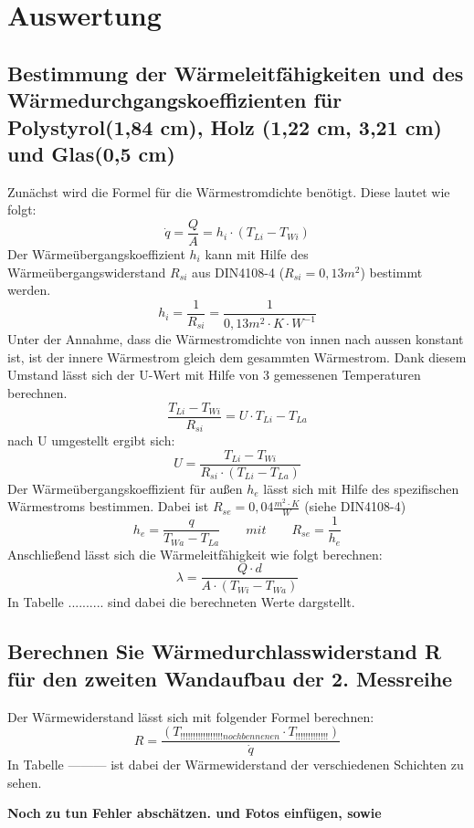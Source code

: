 \section{Auswertung}
\subsection{Bestimmung der Wärmeleitfähigkeiten und des Wärmedurchgangskoeffizienten für Polystyrol(1,84 cm), Holz (1,22 cm, 3,21 cm) und Glas(0,5 cm)}
Zunächst wird die Formel für die Wärmestromdichte benötigt. Diese lautet wie folgt:
\begin{equation}
\dot q=\frac{ Q }{ A }=h_{ i }\cdot(T_{ Li }-T_{Wi })
  \label{eq:230514_Wärmestromdichte}
\end{equation}
Der Wärmeübergangskoeffizient $h_{i}$ kann mit Hilfe des Wärmeübergangswiderstand $R_{si}$ aus DIN4108-4 ($R_{si}=0,13 m^2$) bestimmt werden.
\begin{equation}
h_{i}=\frac{ 1 }{ R_{ si } }=\frac{ 1 }{ 0,13m^2\cdot K \cdot W^{-1} }
  \label{eq:230514_Wärmeübergangskoeffizient}
\end{equation}
Unter der Annahme, dass die Wärmestromdichte von innen nach aussen konstant ist, ist der innere Wärmestrom gleich dem gesammten Wärmestrom. Dank diesem Umstand lässt sich der U-Wert mit Hilfe von 3 gemessenen Temperaturen berechnen.
\begin{equation}
\frac{ T_{Li} - T_{Wi}}{ R_{ si } }=U \cdot T_{Li} - T_{La}
  \label{eq:230514_u1}
\end{equation}
nach U umgestellt ergibt sich: 
\begin{equation}
U = \frac{ T_{Li} - T_{Wi}}{ R_{ si } \cdot  (T_{Li} - T_{La})}
  \label{eq:230514_u2}
\end{equation}
Der Wärmeübergangskoeffizient für außen $h_{e}$ lässt sich mit Hilfe des spezifischen Wärmestroms bestimmen. Dabei ist $R_{se}=0,04 \frac{ m^2 \cdot K }{W}$ (siehe DIN4108-4)
\begin{equation}
h_{e}=\frac{ q }{ T_{Wa} - T_{La} }   \qquad  mit     \qquad       R_{se}=\frac{ 1 }{ h_{e} }
  \label{eq:230514_h_e}
\end{equation}
Anschließend lässt sich die Wärmeleitfähigkeit wie folgt berechnen:
\begin{equation}
\lambda=\frac{ Q \cdot d }{ A \cdot ( T_{Wi} - T_{Wa} )}
  \label{eq:230514_lamda}
\end{equation}
In Tabelle ..........  sind dabei die berechneten Werte dargstellt.
\subsection{Berechnen Sie Wärmedurchlasswiderstand R für den zweiten Wandaufbau der 2. Messreihe}
Der Wärmewiderstand lässt sich mit folgender Formel berechnen:
%
\begin{equation}
R=\frac{(T_{!!!!!!!!!!!!!!!!! noch bennenen } \cdot T_{!!!!!!!!!!!!!} )}{\dot q}
  \label{eq:230522_Wärmewiderstand}
\end{equation}
%
In Tabelle ---------  ist dabei der Wärmewiderstand der verschiedenen Schichten zu sehen.

\textbf{Noch zu tun Fehler abschätzen. und Fotos einfügen, sowie  }
